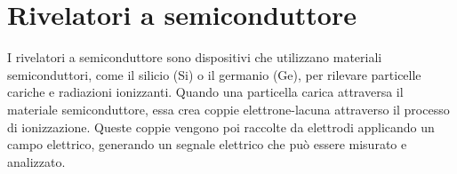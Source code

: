 \section{Rivelatori a semiconduttore}
I rivelatori a semiconduttore sono dispositivi che utilizzano materiali semiconduttori, come il silicio (Si) o il germanio (Ge), per rilevare particelle cariche e radiazioni ionizzanti. Quando una particella carica attraversa il materiale semiconduttore, essa crea coppie elettrone-lacuna attraverso il processo di ionizzazione. Queste coppie vengono poi raccolte da elettrodi applicando un campo elettrico, generando un segnale elettrico che può essere misurato e analizzato.\\

